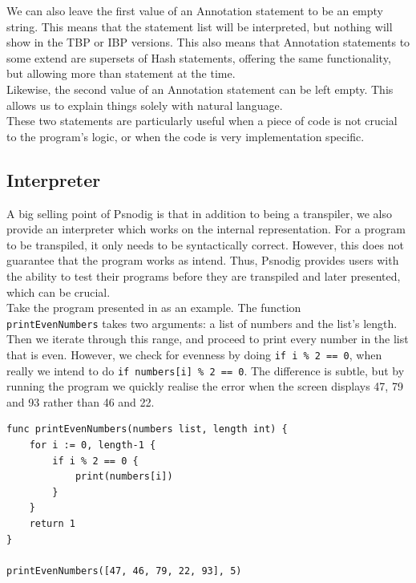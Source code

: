 We can also leave the first value of an Annotation statement to be an empty string. This means that the statement list will be interpreted, but nothing will show in the TBP or IBP versions. This also means that Annotation statements to some extend are supersets of Hash statements, offering the same functionality, but allowing more than statement at the time. \\

Likewise, the second value of an Annotation statement can be left empty. This allows us to explain things solely with natural language. \\

These two statements are particularly useful when a piece of code is not crucial to the program's logic, or when the code is very implementation specific.

\subsection{Interpreter}

A big selling point of Psnodig is that in addition to being a transpiler, we also provide an interpreter which works on the internal representation. For a program to be transpiled, it only needs to be syntactically correct. However, this does not guarantee that the program works as intend. Thus, Psnodig provides users with the ability to test their programs before they are transpiled and later presented, which can be crucial. \\

Take the program presented in  as an example. The function \\ \texttt{printEvenNumbers} takes two arguments: a list of numbers and the list's length. Then we iterate through this range, and proceed to print every number in the list that is even. However, we check for evenness by doing \texttt{if i \% 2 == 0}, when really we intend to do \texttt{if numbers[i] \% 2 == 0}. The difference is subtle, but by running the program we quickly realise the error when the screen displays 47, 79 and 93 rather than 46 and 22. \\

\begin{lstlisting}[caption={A syntactically correct Gourmet program with a subtle logical error.}, captionpos=b, label={A syntactically correct program with a subtle logical error.}]
func printEvenNumbers(numbers list, length int) {
    for i := 0, length-1 {
        if i % 2 == 0 {
            print(numbers[i])
        }
    }
    return 1
}

printEvenNumbers([47, 46, 79, 22, 93], 5)
\end{lstlisting}

